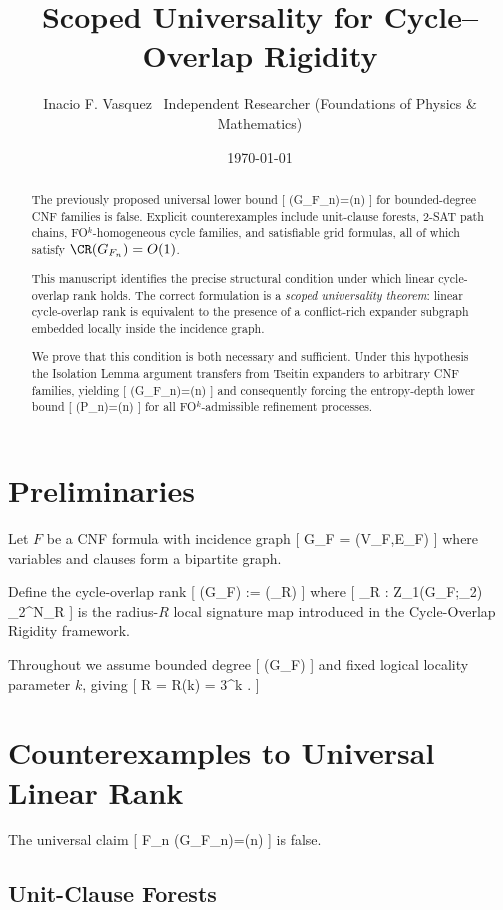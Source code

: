 \title{Scoped Universality for Cycle–Overlap Rigidity}
\author{Inacio F. Vasquez \ Independent Researcher (Foundations of Physics & Mathematics)}
\date{\today}

\begin{abstract}
The previously proposed universal lower bound
[
\CR(G_{F_n})=\Omega(n)
]
for bounded-degree CNF families is false. Explicit counterexamples include unit-clause forests, 2-SAT path chains, FO$^k$-homogeneous cycle families, and satisfiable grid formulas, all of which satisfy $\CR(G_{F_n})=O(1)$.

This manuscript identifies the precise structural condition under which linear cycle-overlap rank holds. The correct formulation is a \emph{scoped universality theorem}: linear cycle-overlap rank is equivalent to the presence of a conflict-rich expander subgraph embedded locally inside the incidence graph.

We prove that this condition is both necessary and sufficient. Under this hypothesis the Isolation Lemma argument transfers from Tseitin expanders to arbitrary CNF families, yielding
[
\CR(G_{F_n})=\Theta(n)
]
and consequently forcing the entropy-depth lower bound
[
\ED(P_n)=\Theta(n)
]
for all FO$^k$-admissible refinement processes.
\end{abstract}

\section{Preliminaries}

Let $F$ be a CNF formula with incidence graph
[
G_F = (V_F,E_F)
]
where variables and clauses form a bipartite graph.

Define the cycle-overlap rank
[
\CR(G_F) := \rank(\Phi_R)
]
where
[
\Phi_R : Z_1(G_F;_2) \to {}_2^{N_R}
]
is the radius-$R$ local signature map introduced in the Cycle-Overlap Rigidity framework.

Throughout we assume bounded degree
[
\deg(G_F) \le \Delta
]
and fixed logical locality parameter $k$, giving
[
R = R(k) = 3^k .
]

\section{Counterexamples to Universal Linear Rank}

The universal claim
[
\forall F_n \quad \CR(G_{F_n})=\Omega(n)
]
is false.

\subsection{Unit-Clause Forests}

